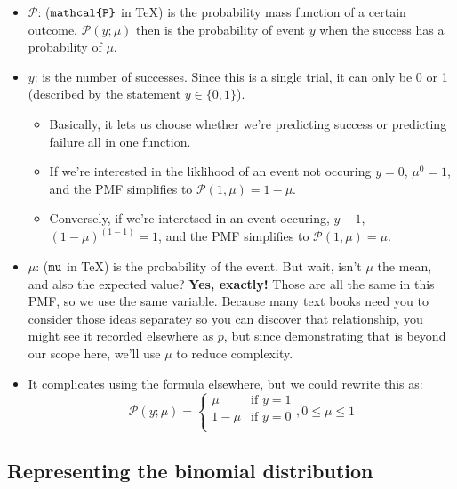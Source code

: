 \documentclass[
]{book}
\providecommand{\tightlist}{%
  \setlength{\itemsep}{0pt}\setlength{\parskip}{0pt}}
\begin{document}
\begin{itemize}
\tightlist
\item
  \(\mathcal{P}\): (\(\texttt{\\mathcal\{P\}}\) in TeX) is the probability mass function of a certain outcome. \(\mathcal{P}(y;\mu)\) then is the probability of event \(y\) when the success has a probability of \(\mu\).
\item
  \(y\): is the number of successes. Since this is a single trial, it can only be 0 or 1 (described by the statement \(y\in\{0, 1\}\)).

  \begin{itemize}
  \tightlist
  \item
    Basically, it lets us choose whether we're predicting success or predicting failure all in one function.
  \item
    If we're interested in the liklihood of an event not occuring \(y=0\), \(\mu^0=1\), and the PMF simplifies to \(\mathcal{P(1,\mu)}=1-\mu\).
  \item
    Conversely, if we're interetsed in an event occuring, \(y-1\), \((1-\mu)^{(1-1)}=1\), and the PMF simplifies to \(\mathcal{P(1,\mu)}=\mu\).
  \end{itemize}
\item
  \(\mu\): (\(\texttt{\\mu}\) in TeX) is the probability of the event. But wait, isn't \(\mu\) the mean, and also the expected value? \textbf{Yes, exactly!} Those are all the same in this PMF, so we use the same variable. Because many text books need you to consider those ideas separatey so you can discover that relationship, you might see it recorded elsewhere as \(p\), but since demonstrating that is beyond our scope here, we'll use \(\mu\) to reduce complexity.
\item
  It complicates using the formula elsewhere, but we could rewrite this as:
  \[
  \mathcal{P}(y;\mu)=
  \begin{cases}
  \mu&\textrm{if }y=1\\
  1-\mu&\textrm{if }y=0\\
  \end{cases}, 0\leq\mu\leq1
  \]
\end{itemize}

\hypertarget{representing-the-binomial-distribution}{%
\subsection{Representing the binomial distribution}\label{representing-the-binomial-distribution}}
\end{document}
